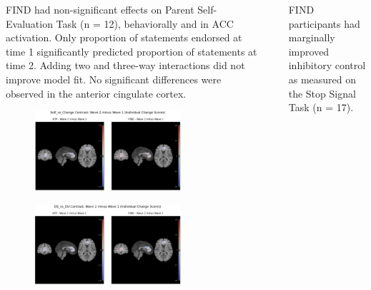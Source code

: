 \documentclass[final]{beamer}
\newlength{\sepwidth}
\newlength{\colwidth}
\newcommand{\separatorcolumn}{\begin{column}{\sepwidth}\end{column}}
\begin{document}
\begin{frame}[t]
\begin{columns}[t]
\begin{column}{\colwidth}
\begin{block}{FIND had non-significant effects on Parent Self-Evaluation Task (n = 12), behaviorally and in ACC activation.}
    Only proportion of statements endorsed at time 1 significantly predicted proportion of statements at time 2. Adding two and three-way interactions did not improve model fit. No significant differences were observed in the anterior cingulate cortex.

    \vspace{-0.35cm}
    \begin{figure}[ht]
      \centering
      \includegraphics[clip, width=0.75\textwidth]{acc_selfchange.png}
      \label{fig:pset_selfchange}
    \end{figure}
    \vspace{-0.65cm}
    \begin{figure}[ht]
      \centering
      \includegraphics[clip, width=0.75\textwidth]{acc_dsdu.png}
      \label{fig:acc_dsdu}
    \end{figure}
  \end{block}

\end{column}

\separatorcolumn

\begin{column}{\colwidth}
    
      \begin{block}{FIND participants had marginally improved inhibitory control as measured on the Stop Signal Task (n = 17).}


\end{block}
\end{column}
\end{columns}
\end{frame}
\end{document}
